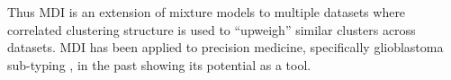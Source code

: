 \documentclass[12pt]{article} %
\begin{document}
	Thus MDI is an extension of mixture models to multiple datasets where correlated clustering structure is used to ``upweigh'' similar clusters across datasets. MDI has been applied to precision medicine, specifically glioblastoma sub-typing \cite{savage_identifying_2013}, in the past showing its potential as a tool.
	
%	
%	
\end{document}
